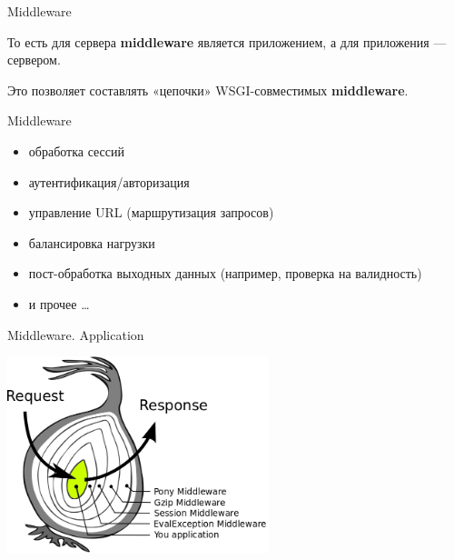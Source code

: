 \begin{frame}{Middleware}

    То есть для сервера \textbf{middleware} является приложением, а для
    приложения — сервером.

    Это позволяет составлять «цепочки» WSGI-совместимых \textbf{middleware}.

\end{frame}

\begin{frame}{Middleware}

    \begin{itemize}
        \item обработка сессий
        \item аутентификация/авторизация
        \item управление URL (маршрутизация запросов)
        \item балансировка нагрузки
        \item пост-обработка выходных данных (например, проверка на валидность)
        \item и прочее \ldots
    \end{itemize}

\end{frame}

\begin{frame}{Middleware. Application}

    \begin{center}
        \vspace{-0.35in}\includegraphics[width=3in]{media/wsgi-as-onion-app.png}
    \end{center}

\end{frame}

